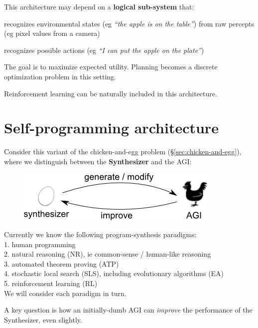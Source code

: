 This architecture may depend on a \textbf{logical sub-system} that:
\begin{compactenum}[1.]
\item  recognizes environmental states (eg \textit{``the apple is on the table''}) from raw percepts (eg pixel values from a camera)
\item  recognizes possible actions (eg \textit{``I can put the apple on the plate''})
\\
\end{compactenum}

The goal is to maximize expected utility.  Planning becomes a discrete optimization problem in this setting.

Reinforcement learning  can be naturally included in this architecture.

\section{Self-programming architecture}
\label{sec:self-programming-architecture}

Consider this variant of the chicken-and-egg problem (\S\ref{sec:chicken-and-egg}), where we distinguish between the \textbf{Synthesizer} and the AGI:
\begin{figure}[H]
\centering
\includegraphics{self-programming-architecture.png}
\vspace{-0.5cm}
\end{figure}

Currently we know the following program-synthesis paradigms:\\
1.  human programming\\
2.  natural reasoning (NR), ie common-sense / human-like reasoning\\
3.  automated theorem proving (ATP)\\
4.  stochastic local search (SLS), including evolutionary algorithms (EA)\\
5.  reinforcement learning (RL) \\
We will consider each paradigm in turn.

A key question is how an initially-dumb AGI can \textit{improve} the performance of the Synthesizer, even slightly.

